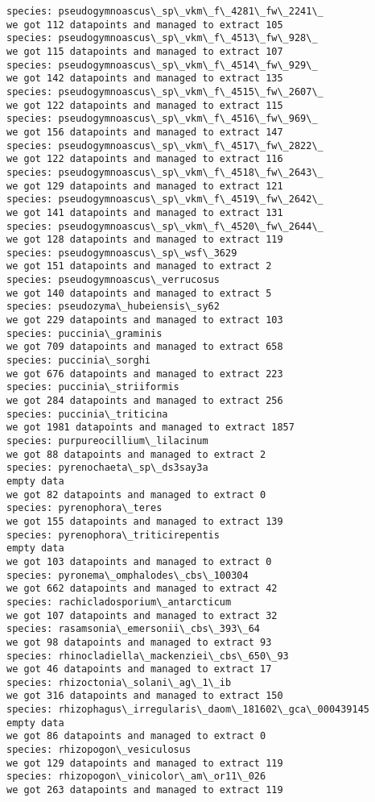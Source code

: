\documentclass[11pt]{article}
\begin{document}
\begin{Verbatim}[commandchars=\\\{\}]
species: pseudogymnoascus\_sp\_vkm\_f\_4281\_fw\_2241\_
we got 112 datapoints and managed to extract 105
species: pseudogymnoascus\_sp\_vkm\_f\_4513\_fw\_928\_
we got 115 datapoints and managed to extract 107
species: pseudogymnoascus\_sp\_vkm\_f\_4514\_fw\_929\_
we got 142 datapoints and managed to extract 135
species: pseudogymnoascus\_sp\_vkm\_f\_4515\_fw\_2607\_
we got 122 datapoints and managed to extract 115
species: pseudogymnoascus\_sp\_vkm\_f\_4516\_fw\_969\_
we got 156 datapoints and managed to extract 147
species: pseudogymnoascus\_sp\_vkm\_f\_4517\_fw\_2822\_
we got 122 datapoints and managed to extract 116
species: pseudogymnoascus\_sp\_vkm\_f\_4518\_fw\_2643\_
we got 129 datapoints and managed to extract 121
species: pseudogymnoascus\_sp\_vkm\_f\_4519\_fw\_2642\_
we got 141 datapoints and managed to extract 131
species: pseudogymnoascus\_sp\_vkm\_f\_4520\_fw\_2644\_
we got 128 datapoints and managed to extract 119
species: pseudogymnoascus\_sp\_wsf\_3629
we got 151 datapoints and managed to extract 2
species: pseudogymnoascus\_verrucosus
we got 140 datapoints and managed to extract 5
species: pseudozyma\_hubeiensis\_sy62
we got 229 datapoints and managed to extract 103
species: puccinia\_graminis
we got 709 datapoints and managed to extract 658
species: puccinia\_sorghi
we got 676 datapoints and managed to extract 223
species: puccinia\_striiformis
we got 284 datapoints and managed to extract 256
species: puccinia\_triticina
we got 1981 datapoints and managed to extract 1857
species: purpureocillium\_lilacinum
we got 88 datapoints and managed to extract 2
species: pyrenochaeta\_sp\_ds3say3a
empty data
we got 82 datapoints and managed to extract 0
species: pyrenophora\_teres
we got 155 datapoints and managed to extract 139
species: pyrenophora\_triticirepentis
empty data
we got 103 datapoints and managed to extract 0
species: pyronema\_omphalodes\_cbs\_100304
we got 662 datapoints and managed to extract 42
species: rachicladosporium\_antarcticum
we got 107 datapoints and managed to extract 32
species: rasamsonia\_emersonii\_cbs\_393\_64
we got 98 datapoints and managed to extract 93
species: rhinocladiella\_mackenziei\_cbs\_650\_93
we got 46 datapoints and managed to extract 17
species: rhizoctonia\_solani\_ag\_1\_ib
we got 316 datapoints and managed to extract 150
species: rhizophagus\_irregularis\_daom\_181602\_gca\_000439145
empty data
we got 86 datapoints and managed to extract 0
species: rhizopogon\_vesiculosus
we got 129 datapoints and managed to extract 119
species: rhizopogon\_vinicolor\_am\_or11\_026
we got 263 datapoints and managed to extract 119

\end{Verbatim}
\end{document}
